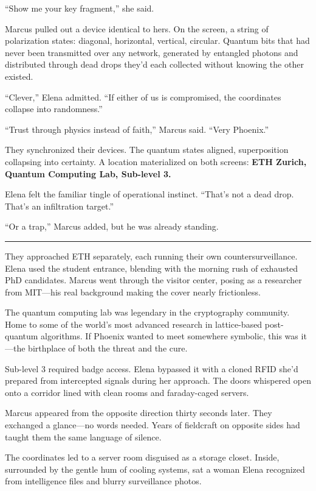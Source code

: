 ``Show me your key fragment,'' she said.

Marcus pulled out a device identical to hers. On the screen, a string of polarization states: diagonal, horizontal, vertical, circular. Quantum bits that had never been transmitted over any network, generated by entangled photons and distributed through dead drops they'd each collected without knowing the other existed.

``Clever,'' Elena admitted. ``If either of us is compromised, the coordinates collapse into randomness.''

``Trust through physics instead of faith,'' Marcus said. ``Very Phoenix.''

They synchronized their devices. The quantum states aligned, superposition collapsing into certainty. A location materialized on both screens: \textbf{ETH Zurich, Quantum Computing Lab, Sub-level 3.}

Elena felt the familiar tingle of operational instinct. ``That's not a dead drop. That's an infiltration target.''

``Or a trap,'' Marcus added, but he was already standing.

\begin{center}\rule{0.5\linewidth}{0.5pt}\end{center}

They approached ETH separately, each running their own countersurveillance. Elena used the student entrance, blending with the morning rush of exhausted PhD candidates. Marcus went through the visitor center, posing as a researcher from MIT---his real background making the cover nearly frictionless.

The quantum computing lab was legendary in the cryptography community. Home to some of the world's most advanced research in lattice-based post-quantum algorithms. If Phoenix wanted to meet somewhere symbolic, this was it---the birthplace of both the threat and the cure.

Sub-level 3 required badge access. Elena bypassed it with a cloned RFID she'd prepared from intercepted signals during her approach. The doors whispered open onto a corridor lined with clean rooms and faraday-caged servers.

Marcus appeared from the opposite direction thirty seconds later. They exchanged a glance---no words needed. Years of fieldcraft on opposite sides had taught them the same language of silence.

The coordinates led to a server room disguised as a storage closet. Inside, surrounded by the gentle hum of cooling systems, sat a woman Elena recognized from intelligence files and blurry surveillance photos.

